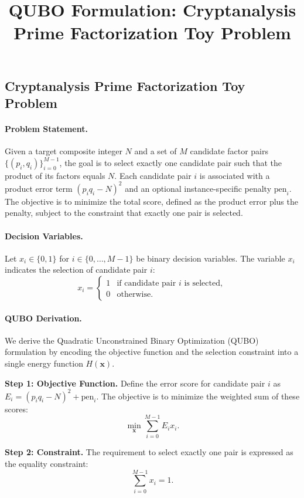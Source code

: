 \documentclass[12pt]{article}
\title{QUBO Formulation: Cryptanalysis Prime Factorization Toy Problem}
\date{}
\begin{document}
\maketitle

\subsection*{Cryptanalysis Prime Factorization Toy Problem}

\paragraph{Problem Statement.}
Given a target composite integer $N$ and a set of $M$ candidate factor pairs $\{(p_i, q_i)\}_{i=0}^{M-1}$, the goal is to select exactly one candidate pair such that the product of its factors equals $N$. Each candidate pair $i$ is associated with a product error term $(p_i q_i - N)^2$ and an optional instance-specific penalty $\text{pen}_i$. The objective is to minimize the total score, defined as the product error plus the penalty, subject to the constraint that exactly one pair is selected.

\paragraph{Decision Variables.}
Let $x_i \in \{0,1\}$ for $i \in \{0, \dots, M-1\}$ be binary decision variables. The variable $x_i$ indicates the selection of candidate pair $i$:
\[
x_i = \begin{cases} 
1 & \text{if candidate pair } i \text{ is selected}, \\
0 & \text{otherwise}.
\end{cases}
\]

\paragraph{QUBO Derivation.}
We derive the Quadratic Unconstrained Binary Optimization (QUBO) formulation by encoding the objective function and the selection constraint into a single energy function $H(\mathbf{x})$.

\textbf{Step 1: Objective Function.}
Define the error score for candidate pair $i$ as $E_i = (p_i q_i - N)^2 + \text{pen}_i$. The objective is to minimize the weighted sum of these scores:
\[
\min_{\mathbf{x}} \sum_{i=0}^{M-1} E_i x_i.
\]

\textbf{Step 2: Constraint.}
The requirement to select exactly one pair is expressed as the equality constraint:
\[
\sum_{i=0}^{M-1} x_i = 1.
\]
\end{document}
